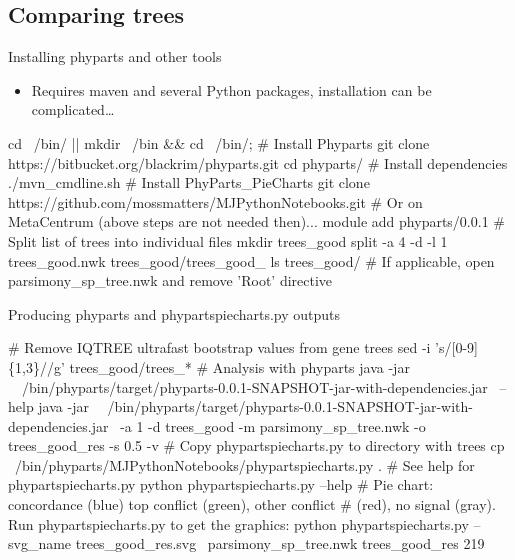 \documentclass[compress,  xelatex, 11pt, xcolor=x11names, aspectratio=169,
	hyperref={
		bookmarks=true,
		unicode=true,
		colorlinks=true,
		pdftitle={HybSeq course},
		plainpages=false,
		pdfauthor={Vojtech Zeisek},
		pdfsubject={Practical processing of HybSeq target enrichment sequencing data on computing grids like MetaCentrum},
		pdfcreator={XeLaTeX},
		pdfkeywords={BASH, command line, GNU, HybSeq, Linux, MetaCentrum, sequencing shell, target enrichment},
		linkcolor=Turquoise4, %
		anchorcolor=DodgerBlue4, %
		citecolor=DodgerBlue4, %
		filecolor=DodgerBlue4, %
		menucolor=Tan4, %
		urlcolor=DarkOliveGreen4 %
		},
	url={hyphens, lowtilde} %
	]{beamer}
\renewcommand{\texttt}[1]{\colorbox{Cornsilk2}{{\ttfamily #1}}}
\begin{document}
\subsection{Comparing trees}

\begin{frame}[fragile]{Installing phyparts and other tools}
	\begin{itemize}
		\item Requires \texttt{maven} and several Python packages, installation can be complicated\ldots
	\end{itemize}
	\begin{bashcode}
    cd ~/bin/ || { mkdir ~/bin && cd ~/bin/; }
    # Install Phyparts
    git clone https://bitbucket.org/blackrim/phyparts.git
    cd phyparts/
    # Install dependencies
    ./mvn_cmdline.sh
    # Install PhyParts_PieCharts
    git clone https://github.com/mossmatters/MJPythonNotebooks.git
    # Or on MetaCentrum (above steps are not needed then)...
    module add phyparts/0.0.1
    # Split list of trees into individual files
    mkdir trees_good
    split -a 4 -d -l 1 trees_good.nwk trees_good/trees_good_
    ls trees_good/
    # If applicable, open parsimony_sp_tree.nwk and remove 'Root' directive
	\end{bashcode}
\end{frame}

\begin{frame}[fragile]{Producing phyparts and phypartspiecharts.py outputs}
	\begin{bashcode}
    # Remove IQTREE ultrafast bootstrap values from gene trees
    sed -i 's/\/[0-9]\{1,3\}//g' trees_good/trees_*
    # Analysis with phyparts
    java -jar \
      ~/bin/phyparts/target/phyparts-0.0.1-SNAPSHOT-jar-with-dependencies.jar \
      --help
    java -jar \
      ~/bin/phyparts/target/phyparts-0.0.1-SNAPSHOT-jar-with-dependencies.jar \
      -a 1 -d trees_good -m parsimony_sp_tree.nwk -o trees_good_res -s 0.5 -v
    # Copy phypartspiecharts.py to directory with trees
    cp ~/bin/phyparts/MJPythonNotebooks/phypartspiecharts.py .
    # See help for phypartspiecharts.py
    python phypartspiecharts.py --help
    # Pie chart: concordance (blue) top conflict (green), other conflict
    # (red), no signal (gray). Run phypartspiecharts.py to get the graphics:
    python phypartspiecharts.py --svg_name trees_good_res.svg \
      parsimony_sp_tree.nwk trees_good_res 219
	\end{bashcode}
\end{frame}
\end{document}
